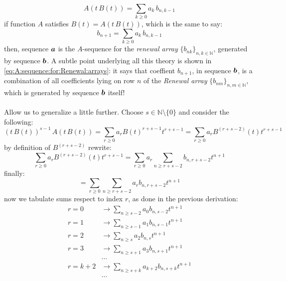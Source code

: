 \begin{displaymath}
    [t^{n+1}]A(t\,B(t))=\sum_{k\geq 0}{a_{k}\,b_{n,k-1}}
\end{displaymath}
if function $A$ satisfies 
$B(t)=A(t\,B(t))$, which is the same to say:
\begin{equation}
    b_{n+1}=\sum_{k\geq 0}{a_{k}\,b_{n,k-1}}
    \label{eq:A:sequence:for:Renewal:arrays}
\end{equation}
then, sequence $\boldsymbol{a}$ is the $A$-sequence for the \emph{renewal array}
$\lbrace b_{nk}\rbrace_{n,k\in\mathbb{N}}$, generated by sequence $\boldsymbol{b}$.
A subtle point underlying all this theory is shown in 
\autoref{eq:A:sequence:for:Renewal:arrays}: it says that coeffient
$b_{n+1}$, in sequence $\boldsymbol{b}$, is a combination
of all coefficients lying on row $n$ of the \emph{Renewal array}
$\lbrace b_{nm}\rbrace_{n,m\in\mathbb{N}}$,
which is generated by sequence $\boldsymbol{b}$ itself!
\\\\
Allow us to generalize a little further. Choose 
$s\in\mathbb{N}\setminus\lbrace0\rbrace$ and consider the following:
\begin{displaymath}
    (t\,B(t))^{s-1}\,A\left(t\,B(t)\right) 
        = \sum_{r\geq 0}{a_{r}B(t)^{r+s-1}t^{r+s-1}}
        = \sum_{r\geq 0}{a_{r}B^{(r+s-2)}(t)t^{r+s-1}}
\end{displaymath}
by definition of $B^{(r+s-2)}$ rewrite:
\begin{displaymath}
    \sum_{r\geq 0}{a_{r}B^{(r+s-2)}(t)t^{r+s-1}}
        =\sum_{r\geq 0}{a_{r}\sum_{n\geq r+s-2}{b_{n,r+s-2}t^{n+1}}}
\end{displaymath}
finally:
\begin{displaymath}
    =\sum_{r\geq 0}{\sum_{n\geq r+s-2}{a_{r}b_{n,r+s-2}t^{n+1}}}
\end{displaymath}
now we tabulate sums respect to index $r$, as done in the previous derivation:
\begin{displaymath}
    \begin{split}
        r=0 &\rightarrow \sum_{n\geq s-2}{a_{0}b_{n,s-2}t^{n+1}}\\
        r=1 &\rightarrow \sum_{n\geq s-1}{a_{1}b_{n,s-1}t^{n+1}}\\
        r=2 &\rightarrow \sum_{n\geq s}{a_{2}b_{n,s}t^{n+1}}\\
        r=3 &\rightarrow \sum_{n\geq s+1}{a_{3}b_{n,s+1}t^{n+1}}\\
        &\ldots\\
        r=k+2 &\rightarrow \sum_{n\geq s+k}{a_{k+2}b_{n,s+k}t^{n+1}}\\
        &\ldots\\
    \end{split}
\end{displaymath}
